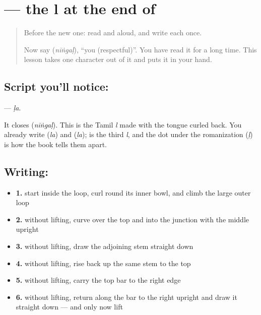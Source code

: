 \section[\texorpdfstring{\ta{ள} (ḷa)}{ள (ḷa)}]{ — the l at the end of }

\label{lesson:TA-S131-letter-lla}



\begin{quote}
Before the new one: read  and  aloud, and write each once.

Now say \textbf{} (\emph{nīṅgaḷ}), \textquotedblleft{}you (respectful)\textquotedblright{}. You have read it for a long time. This lesson takes one character out of it and puts it in your hand.
\end{quote}

\subsection*{Script you'll notice: }
\textbf{} — \emph{ḷa}.

It closes \textbf{} (\emph{nīṅgaḷ}). This is the Tamil \emph{l} made with the tongue curled back. You already write \textbf{} (\emph{la}) and \textbf{} (\emph{ḻa});  is the third \emph{l}, and the dot under the romanization (\emph{ḷ}) is how the book tells them apart.

\subsection*{Writing: }

\begin{itemize}
\raggedright
  \item \textbf{1.} start inside the loop, curl round its inner bowl, and climb the large outer loop
  \item \textbf{2.} without lifting, curve over the top and into the junction with the middle upright
  \item \textbf{3.} without lifting, draw the adjoining stem straight down
  \item \textbf{4.} without lifting, rise back up the same stem to the top
  \item \textbf{5.} without lifting, carry the top bar to the right edge
  \item \textbf{6.} without lifting, return along the bar to the right upright and draw it straight down — and only now lift
\end{itemize}

